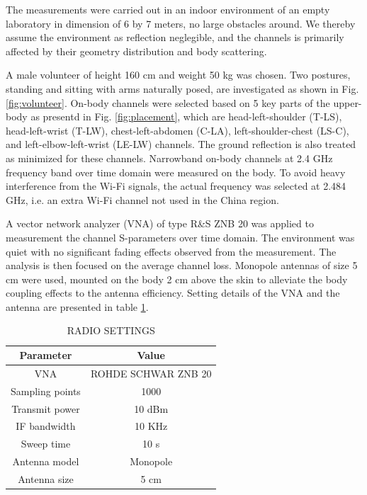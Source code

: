 \documentclass[conference]{IEEEtran}
\begin{document}
The measurements were carried out in an indoor environment of an empty laboratory in dimension of 6 by 7 meters, no large obstacles around. We thereby assume the environment as reflection neglegible, and the channels is primarily affected by their geometry distribution and body scattering.

A male volunteer of height 160 cm and weight 50 kg was chosen. Two postures, standing and sitting with arms naturally posed, are investigated as shown in Fig. \ref{fig:volunteer}. On-body channels were selected based on 5 key parts of the upper-body as presentd in Fig. \ref{fig:placement}, which are head-left-shoulder (T-LS), head-left-wrist (T-LW), chest-left-abdomen (C-LA), left-shoulder-chest (LS-C), and left-elbow-left-wrist (LE-LW) channels. The ground reflection is also treated as minimized for these channels. Narrowband on-body channels at 2.4 GHz frequency band over time domain were measured on the body. To avoid heavy interference from the Wi-Fi signals, the actual frequency was selected at 2.484 GHz, i.e. an extra Wi-Fi channel not used in the China region. 

A vector network analyzer (VNA) of type R\&S ZNB 20 was applied to measurement the channel S-parameters over time domain. The environment was quiet with no significant fading effects observed from the measurement. The analysis is then focused on the average channel loss. Monopole antennas of size 5 cm were used, mounted on the body 2 cm above the skin to alleviate the body coupling effects to the antenna efficiency. Setting details of the VNA and the antenna are presented in table \ref{tab:1}.

\begin{table}[!t]
\centering
\captionsetup{labelsep=newline}
\caption{RADIO SETTINGS}
\label{tab:1}
\begin{tabular}{cc}
\hline
Parameter&Value\\
\hline
VNA&ROHDE SCHWAR ZNB 20\\
Sampling points&1000\\
Transmit power&10 dBm\\
IF bandwidth&10 KHz\\
Sweep time&10 s\\
\hline
Antenna model&Monopole\\
Antenna size&5 cm\\
\hline
\end{tabular}
\end{table}
\end{document}
